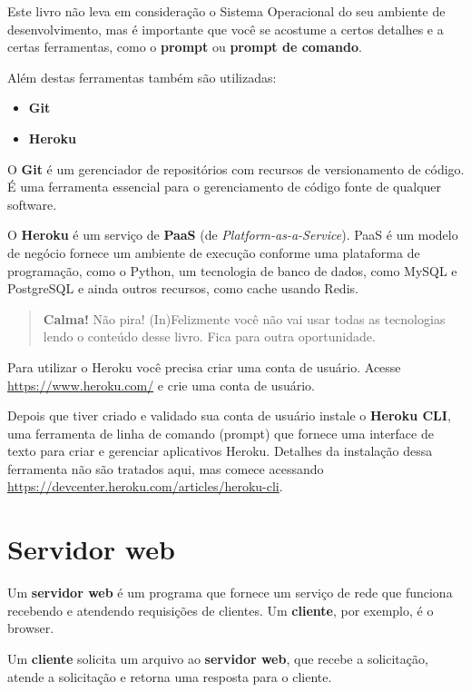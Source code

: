 \documentclass[brazil,a4paper,oneside,openright,parskip=full]{book}
\providecommand{\tightlist}{%
  \setlength{\itemsep}{0pt}\setlength{\parskip}{0pt}}
\begin{document}
Este livro não leva em consideração o Sistema Operacional do seu
ambiente de desenvolvimento, mas é importante que você se acostume a
certos detalhes e a certas ferramentas, como o \textbf{prompt} ou
\textbf{prompt de comando}.

Além destas ferramentas também são utilizadas:

\begin{itemize}
\tightlist
\item
  \textbf{Git}
\item
  \textbf{Heroku}
\end{itemize}

O \textbf{Git} é um gerenciador de repositórios com recursos de
versionamento de código. É uma ferramenta essencial para o gerenciamento
de código fonte de qualquer software.

O \textbf{Heroku} é um serviço de \textbf{PaaS} (de
\emph{Platform-as-a-Service}). PaaS é um modelo de negócio fornece um
ambiente de execução conforme uma plataforma de programação, como o
Python, um tecnologia de banco de dados, como MySQL e PostgreSQL e ainda
outros recursos, como cache usando Redis.

\begin{quote}
\textbf{Calma!} Não pira! (In)Felizmente você não vai usar todas as
tecnologias lendo o conteúdo desse livro. Fica para outra oportunidade.
\end{quote}

Para utilizar o Heroku você precisa criar uma conta de usuário. Acesse
\url{https://www.heroku.com/} e crie uma conta de usuário.

Depois que tiver criado e validado sua conta de usuário instale o
\textbf{Heroku CLI}, uma ferramenta de linha de comando (prompt) que
fornece uma interface de texto para criar e gerenciar aplicativos
Heroku. Detalhes da instalação dessa ferramenta não são tratados aqui,
mas comece acessando
\url{https://devcenter.heroku.com/articles/heroku-cli}.

\hypertarget{servidor-web}{%
\section{Servidor web}\label{servidor-web}}

Um \textbf{servidor web} é um programa que fornece um serviço de rede
que funciona recebendo e atendendo requisições de clientes. Um
\textbf{cliente}, por exemplo, é o browser.

Um \textbf{cliente} solicita um arquivo ao \textbf{servidor web}, que
recebe a solicitação, atende a solicitação e retorna uma resposta para o
cliente.
\end{document}
